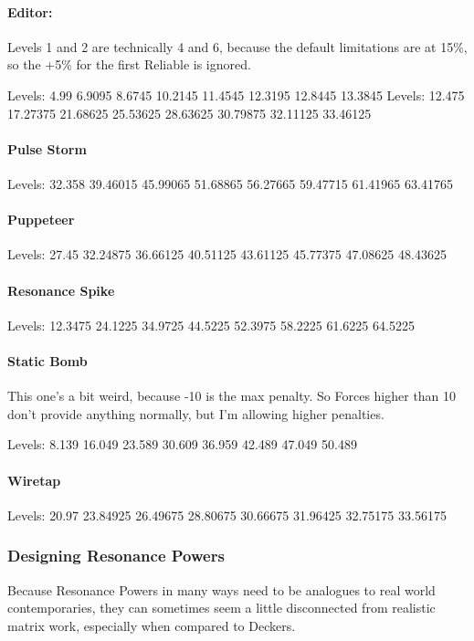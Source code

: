 \begin{multicols*}{2}
	\paragraph{Editor:} 
	Levels 1 and 2 are technically 4 and 6, because the default limitations are at 15\%, so the +5\% for the first Reliable is ignored.	
	
	Levels: 4.99 6.9095 8.6745 10.2145 11.4545 12.3195 12.8445 13.3845
	Levels: 12.475 17.27375 21.68625 25.53625 28.63625 30.79875 32.11125 33.46125
	
	\paragraph{Pulse Storm}
	
	Levels: 32.358 39.46015 45.99065 51.68865 56.27665 59.47715 61.41965 63.41765
	
	\paragraph{Puppeteer}
	Levels: 27.45 32.24875 36.66125 40.51125 43.61125 45.77375 47.08625 48.43625
	
	\paragraph{Resonance Spike}
	
	Levels: 12.3475 24.1225 34.9725 44.5225 52.3975 58.2225 61.6225 64.5225
	
	\paragraph{Static Bomb}
	This one's a bit weird, because -10 is the max penalty. So Forces higher than 10 don't provide anything normally, but I'm allowing higher penalties.
	
	Levels: 8.139 16.049 23.589 30.609 36.959 42.489 47.049 50.489
	
	\paragraph{Wiretap}
	Levels: 20.97 23.84925 26.49675 28.80675 30.66675 31.96425 32.75175 33.56175
	
	\subsubsection{Designing Resonance Powers}
	
	Because Resonance Powers in many ways need to be analogues to real world contemporaries, they can sometimes seem a little disconnected from realistic matrix work, especially when compared to Deckers.
	

\end{multicols*}
